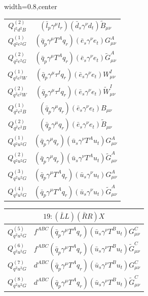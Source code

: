 \begin{table}[H]
\begin{center}
\begin{adjustbox}{width=0.8\textwidth,center}
\begin{minipage}[t]{4.9cm}
\begin{tabular}[t]{c|c}
%
$Q_{l^2d^2B}^{(2)}$  &  $(\bar l_p \gamma^\mu l_r) (\bar d_s \gamma^\nu d_t) \widetilde B_{\mu\nu}$ \\
%
$Q_{q^2e^2G}^{(1)}$  &  $(\bar q_p \gamma^\mu T^A q_r) (\bar e_s \gamma^\nu e_t) G^A_{\mu\nu}$ \\
%
$Q_{q^2e^2G}^{(2)}$  &  $(\bar q_p \gamma^\mu T^A q_r) (\bar e_s \gamma^\nu e_t) \widetilde G^A_{\mu\nu}$ \\
%
$Q_{q^2e^2W}^{(1)}$  &  $(\bar q_p \gamma^\mu \tau^I q_r) (\bar e_s \gamma^\nu e_t) W^I_{\mu\nu}$ \\
%
$Q_{q^2e^2W}^{(2)}$  &  $(\bar q_p \gamma^\mu \tau^I q_r) (\bar e_s \gamma^\nu e_t) \widetilde W^I_{\mu\nu}$ \\
%
$Q_{q^2e^2B}^{(1)}$  &  $(\bar q_p \gamma^\mu q_r) (\bar e_s \gamma^\nu e_t) B_{\mu\nu}$ \\
%
$Q_{q^2e^2B}^{(2)}$  &  $(\bar q_p \gamma^\mu q_r) (\bar e_s \gamma^\nu e_t) \widetilde B_{\mu\nu}$ \\
%
$Q_{q^2u^2G}^{(1)}$  &  $(\bar q_p \gamma^\mu q_r) (\bar u_s \gamma^\nu T^A u_t) G^A_{\mu\nu}$ \\ 
%
$Q_{q^2u^2G}^{(2)}$  &  $(\bar q_p \gamma^\mu q_r) (\bar u_s \gamma^\nu T^A u_t) \widetilde G^A_{\mu\nu}$ \\ 
%
$Q_{q^2u^2G}^{(3)}$  &  $(\bar q_p \gamma^\mu T^A q_r) (\bar u_s \gamma^\nu u_t) G^A_{\mu\nu}$ \\ 
%
$Q_{q^2u^2G}^{(4)}$  &  $(\bar q_p \gamma^\mu T^A q_r) (\bar u_s \gamma^\nu u_t) \widetilde G^A_{\mu\nu}$ 
\end{tabular}
\end{minipage}
\hspace{1cm}
\begin{minipage}[t]{6.1cm}
\renewcommand{\arraystretch}{1.5}
\begin{tabular}[t]{c|c}
\multicolumn{2}{c}{\boldmath$19:(\bar L L)(\bar R R)X$} \\
\hline
$Q_{q^2u^2G}^{(5)}$  &  $f^{ABC} (\bar q_p \gamma^\mu T^A q_r) (\bar u_s \gamma^\nu T^B u_t) G^C_{\mu\nu}$ \\ 
%
$Q_{q^2u^2G}^{(6)}$  &  $f^{ABC} (\bar q_p \gamma^\mu T^A q_r) (\bar u_s \gamma^\nu T^B u_t) \widetilde G^C_{\mu\nu}$ \\ 
%
$Q_{q^2u^2G}^{(7)}$  &  $d^{ABC} (\bar q_p \gamma^\mu T^A q_r) (\bar u_s \gamma^\nu T^B u_t) G^C_{\mu\nu}$ \\ 
%
$Q_{q^2u^2G}^{(8)}$  &  $d^{ABC} (\bar q_p \gamma^\mu T^A q_r) (\bar u_s \gamma^\nu T^B u_t) \widetilde G^C_{\mu\nu}$ \\ 

\end{tabular}
\end{minipage}
\end{adjustbox}
\end{center}
\end{table}
